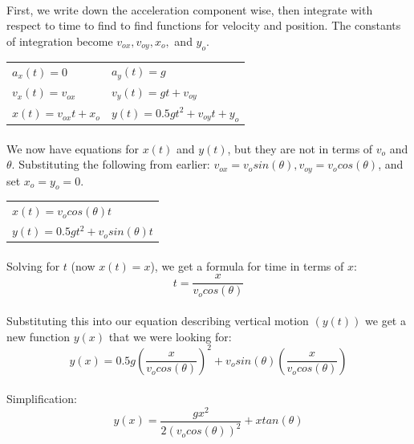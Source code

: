 \documentclass[11pt,a4paper]{report}
\begin{document}
\paragraph{}First, we write down the acceleration component wise, then integrate with respect to time to find to find functions for velocity and position. The constants of integration become $v_{ox}, v_{oy}, x_o,$ and $y_o$.
\begin{center}
\begin{tabular}{l l}
$a_x(t) = 0$ 				& $a_y(t) = g$ \\
$v_x(t) = v_{ox}$ 			& $v_y(t) = gt + v_{oy}$ \\
$x(t) = v_{ox}t + x_o$ 		& $y(t) = 0.5gt^2 + v_{oy}t + y_o$ \\
\end{tabular}
\end{center}
\paragraph{}We now have equations for $x(t)$ and $y(t)$, but they are not in terms of $v_o$ and $\theta$. Substituting the following from earlier: $v_{ox} = v_osin(\theta), v_{oy} = v_ocos(\theta)$, and set $x_o = y_o = 0$. 
\begin{center}
\begin{tabular}{l}
$x(t) = v_ocos(\theta)t$ \\ $y(t) = 0.5gt^2 + v_osin(\theta)t$ \\
\end{tabular}
\end{center}
\paragraph{}Solving for $t$ (now $x(t) = x$), we get a formula for time in terms of $x$:
$$t = \frac{x}{v_ocos(\theta)}$$
\paragraph{}Substituting this into our equation describing vertical motion $(y(t))$ we get a new function $y(x)$ that we were looking for:
$$y(x) = 0.5g(\frac{x}{v_ocos(\theta)})^2 + v_osin(\theta)(\frac{x}{v_ocos(\theta)})$$
\paragraph{}Simplification:
$$y(x) = \frac{gx^2}{2(v_ocos(\theta))^2} + xtan(\theta)$$
\end{document}
